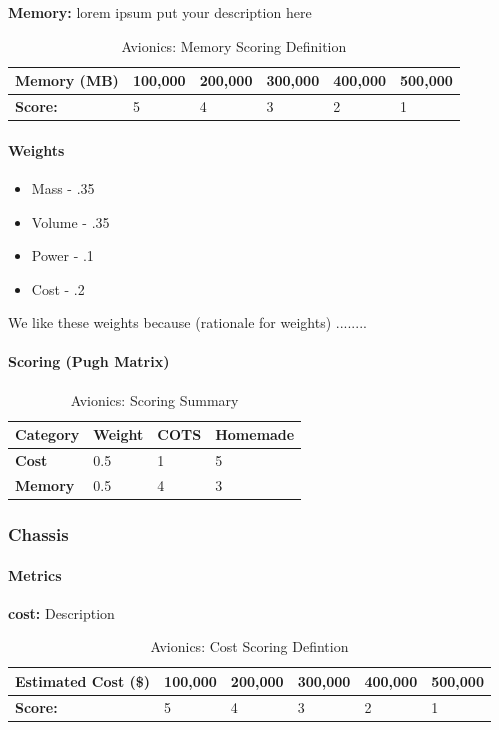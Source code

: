 \documentclass[3p]{elsarticle}
\begin{document}
\textbf{Memory:} lorem ipsum put your description here
\begin{table}[H]
\centering
\begin{tabular}{|l|l|l|l|l|l|} 
\hline
    \textbf{Memory (MB) } & 100,000 & 200,000 & 300,000 & 400,000 & 500,000
    \\
\hline
    \textbf{Score:} & 5 & 4 & 3 & 2 & 1
    \\
\hline
\end{tabular}
\caption{Avionics: Memory Scoring Definition \cite{einstein}}
\label{tbl:avionicsmemory}
\end{table}

\paragraph{Weights}
\begin{itemize}
    \item Mass - .35
    \item Volume - .35
    \item Power - .1
    \item Cost - .2
\end{itemize}

We like these weights because (rationale for weights) ........ 

\paragraph{Scoring (Pugh Matrix)}

\begin{table}[H]
\centering
\begin{tabular}{|l|l|l|l|} 
\hline
    \textbf{Category} & \textbf{Weight} & \textbf{COTS} & \textbf{Homemade}
    \\
\hline
    \textbf{Cost} & 0.5 & 1 & 5
    \\
\hline
    \textbf{Memory} & 0.5 & 4 & 3
    \\
\hline
\end{tabular}
\caption{Avionics: Scoring Summary \cite{einstein}}
\label{tbl:avionicsscoresy}
\end{table}

\subsubsection{Chassis}
\paragraph{Metrics}
\textbf{cost:} Description
\begin{table}[H]
\centering
\begin{tabular}{|l|l|l|l|l|l|} 
\hline
    \textbf{Estimated Cost (\$) } & 100,000 & 200,000 & 300,000 & 400,000 & 500,000
    \\
\hline
    \textbf{Score:} & 5 & 4 & 3 & 2 & 1
    \\
\hline
\end{tabular}
\caption{Avionics: Cost Scoring Defintion \cite{einstein}}
\label{tbl:avioniccost}
\end{table}
\end{document}
